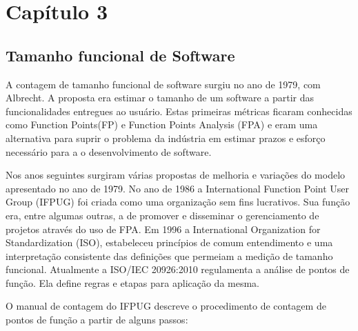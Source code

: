\chapter*[Capítulo 3]{Capítulo 3}

\section{Tamanho funcional de Software}

A contagem de tamanho funcional de software surgiu no ano de 1979, com Albrecht. A proposta era estimar o tamanho de um software a partir das funcionalidades entregues ao usuário. Estas primeiras métricas ficaram conhecidas como Function Points(FP)  e  Function Points Analysis (FPA)  e eram uma alternativa para suprir o problema da indústria em estimar prazos e esforço necessário para a o desenvolvimento de software.

Nos anos seguintes surgiram várias propostas de melhoria e variações do modelo apresentado no ano de 1979. No ano de 1986 a International Function Point User Group (IFPUG) foi criada como uma organização sem fins lucrativos. Sua função era, entre algumas outras, a de promover e disseminar o gerenciamento de projetos através do uso de FPA. Em 1996 a International Organization for Standardization (ISO), estabeleceu princípios de comum entendimento e uma interpretação consistente das  definições que permeiam a medição de tamanho funcional. Atualmente a ISO/IEC 20926:2010 regulamenta a análise de pontos de função. Ela define regras e etapas para aplicação da mesma.

O manual de contagem do IFPUG descreve o procedimento de contagem de pontos de função a partir de alguns passos:

